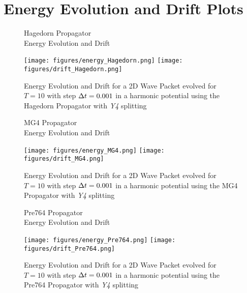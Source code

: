 \appendix

\section{Energy Evolution and Drift Plots}

\begin{figure}[ht]
	\begin{minipage}[c]{\textwidth}
		\begin{center}
			\large Hagedorn Propagator \\[1mm]
			\normalsize Energy Evolution and Drift
			\vspace{4mm}
		\end{center}
	\end{minipage}
	\texttt{[image: figures/energy\_Hagedorn.png]}
	\texttt{[image: figures/drift\_Hagedorn.png]}
	\caption{Energy Evolution and Drift for a 2D Wave Packet evolved for $T = 10$ with step $\Delta t = 0.001$ in a harmonic potential using the Hagedorn Propagator with \emph{Y4} splitting}
	\label{fig:energy_Hagedorn}
\end{figure}

\begin{figure}[ht]
	\begin{minipage}[c]{\textwidth}
		\begin{center}
			\large MG4 Propagator \\[1mm]
			\normalsize Energy Evolution and Drift
			\vspace{4mm}
		\end{center}
	\end{minipage}
	\texttt{[image: figures/energy\_MG4.png]}
	\texttt{[image: figures/drift\_MG4.png]}
	\caption{Energy Evolution and Drift for a 2D Wave Packet evolved for $T = 10$ with step $\Delta t = 0.001$ in a harmonic potential using the MG4 Propagator with \emph{Y4} splitting}
	\label{fig:energy_MG4}
\end{figure}

\begin{figure}[ht]
	\begin{minipage}[c]{\textwidth}
		\begin{center}
			\large Pre764 Propagator \\[1mm]
			\normalsize Energy Evolution and Drift
			\vspace{4mm}
		\end{center}
	\end{minipage}
	\texttt{[image: figures/energy\_Pre764.png]}
	\texttt{[image: figures/drift\_Pre764.png]}
	\caption{Energy Evolution and Drift for a 2D Wave Packet evolved for $T = 10$ with step $\Delta t = 0.001$ in a harmonic potential using the Pre764 Propagator with \emph{Y4} splitting}
	\label{fig:energy_Pre764}
\end{figure}

